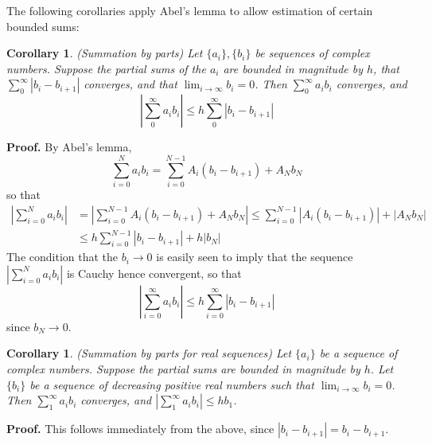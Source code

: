 \documentclass[12pt]{article}
\newtheorem{cor}[thm]{Corollary}
\begin{document}
The following corollaries apply Abel's lemma to allow estimation of certain bounded sums:

\begin{cor} (Summation by parts)
\newline
Let $\{a_i\},\{b_i\}$ be sequences of complex numbers. Suppose the partial sums of the $a_i$ are bounded in magnitude by $h$, that $\sum_0^{\infty} |b_i-b_{i+1}|$ converges, and that $\lim_{i\to\infty} b_i=0$. Then $\sum_0^{\infty} a_i b_i$ converges, and
\[\left|\sum_0^{\infty}a_i b_i\right|\leq h\sum_0^{\infty}|b_i-b_{i+1}|\]
\end{cor}
\textbf{Proof. }
By Abel's lemma,
\[\sum_{i=0}^N a_ib_i = \sum_{i=0}^{N-1} A_i(b_i-b_{i+1}) + A_Nb_N\]
so that
\begin{align*}
\left\lvert \sum_{i=0}^N a_ib_i\right\rvert &= \left\lvert \sum_{i=0}^{N-1} A_i(b_i-b_{i+1}) + A_Nb_N\right\rvert \leq \sum_{i=0}^{N-1}\left\lvert A_i(b_i-b_{i+1})\right\rvert + \left\lvert A_Nb_N\right\rvert\\
&\leq h\sum_{i=0}^{N-1}\left\lvert b_i-b_{i+1}\right\rvert + h\left\lvert b_N\right\rvert
\end{align*}
The condition that the $b_i\to 0$ is easily seen to imply that the sequence $\left\lvert \sum_{i=0}^N a_ib_i\right\rvert$ is Cauchy hence convergent, so that
\[\left\lvert \sum_{i=0}^\infty a_ib_i\right\rvert \leq h\sum_{i=0}^{\infty} \left\lvert b_i-b_{i+1}\right\rvert\]
since $b_N\to 0$.


\begin{cor} (Summation by parts for real sequences)
\newline
Let $\{a_i\}$ be a sequence of complex numbers. Suppose the partial sums are bounded in magnitude by $h$. Let $\{b_i\}$ be a sequence of decreasing positive real numbers such that $\lim_{i\to\infty} b_i=0$. Then $\sum_1^{\infty} a_ib_i$ converges, and $|\sum_1^{\infty} a_ib_i|\leq hb_1$.
\end{cor}
\textbf{Proof. } This follows immediately from the above, since $|b_i-b_{i+1}|=b_i-b_{i+1}$.

\end{document}
